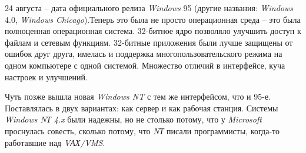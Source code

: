 24 августа -- дата официального релиза \textit{Windows} 95 (другие названия: \textit{Windows} 4.0, \textit{Windows Chicago}).Теперь это была не просто операционная среда -- это была полноценная операционная система. 32-битное ядро позволяло улучшить доступ к файлам и сетевым функциям. 32-битные приложения были лучше защищены от ошибок друг друга, имелась и поддержка многопользовательского режима на одном компьютере с одной системой. Множество отличий в интерфейсе, куча настроек и улучшений.

Чуть позже вышла новая \textit{Windows NT} с тем же интерфейсом, что и 95-е. Поставлялась в двух вариантах: как сервер и как рабочая станция. Системы \textit{Windows NТ 4.x} были надежны, но не столько потому, что у \textit{Microsoft} проснулась совесть, сколько потому, что \textit{NТ} писали программисты, когда-то работавшие над \textit{VАХ/VMS}.

